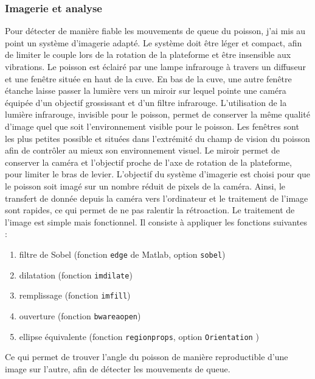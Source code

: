 \subsubsection{Imagerie et analyse}
Pour détecter de manière fiable les mouvements de queue du poisson, j'ai mis au point un système d'imagerie adapté. Le système doit être léger et compact, afin de limiter le couple lors de la rotation de la plateforme et être insensible aux vibrations. Le poisson est éclairé par une lampe infrarouge à travers un diffuseur et une fenêtre située en haut de la cuve. En bas de la cuve, une autre fenêtre étanche laisse passer la lumière vers un miroir sur lequel pointe une caméra équipée d'un objectif grossissant et d'un filtre infrarouge. L'utilisation de la lumière infrarouge, invisible pour le poisson, permet de conserver la même qualité d'image quel que soit l'environnement visible pour le poisson. Les fenêtres sont les plus petites possible et situées dans l'extrémité du champ de vision du poisson afin de contrôler au mieux son environnement visuel. Le miroir permet de conserver la caméra et l'objectif proche de l'axe de rotation de la plateforme, pour limiter le bras de levier.
L'objectif du système d'imagerie est choisi pour que le poisson soit imagé sur un nombre réduit de pixels de la caméra. Ainsi, le transfert de donnée depuis la caméra vers l'ordinateur et le traitement de l'image sont rapides, ce qui permet de ne pas ralentir la rétroaction. Le traitement de l'image est simple mais fonctionnel. Il consiste à appliquer les fonctions suivantes :

\begin{enumerate} \itemsep0em
    \item filtre de Sobel (fonction \verb|edge| de Matlab, option \verb|sobel|)
    \item dilatation (fonction \verb|imdilate|)
    \item remplissage (fonction \verb|imfill|)
    \item ouverture (fonction \verb|bwareaopen|)
    \item ellipse équivalente (fonction \verb|regionprops|, option \verb|Orientation| )
\end{enumerate}

Ce qui permet de trouver l'angle du poisson de manière reproductible d'une image sur l'autre, afin de détecter les mouvements de queue.

